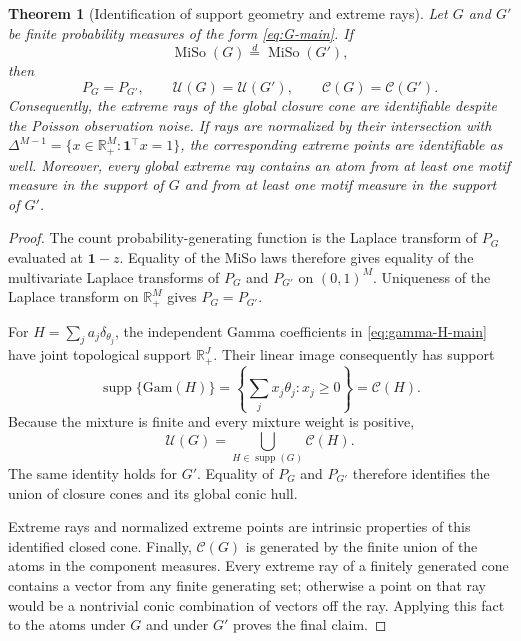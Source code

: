 \documentclass[11pt]{article}
\newcommand{\R}{\mathbb{R}}
\newcommand{\Gam}{\mathrm{Gam}}
\newcommand{\MiSo}{\operatorname{MiSo}}
\newcommand{\one}{\mathbf{1}}
\theoremstyle{plain}
\newtheorem{theorem}{Theorem}
\theoremstyle{definition}
\begin{document}
\begin{theorem}[Identification of support geometry and extreme rays]
\label{thm:global-cone-main}
Let $G$ and $G'$ be finite probability measures of the form
\eqref{eq:G-main}.  If
\[
  \MiSo(G)\overset{d}{=}\MiSo(G'),
\]
then
\[
  P_G=P_{G'},
  \qquad
  \mathcal U(G)=\mathcal U(G'),
  \qquad
  \mathcal C(G)=\mathcal C(G').
\]
Consequently, the extreme rays of the global closure cone are identifiable
despite the Poisson observation noise.  If rays are normalized by their
intersection with
$\Delta^{M-1}=\{x\in\R_+^M:\one^\top x=1\}$, the corresponding extreme
points are identifiable as well.  Moreover, every global extreme ray
contains an atom from at least one motif measure in the support of $G$ and
from at least one motif measure in the support of $G'$.
\end{theorem}

\begin{proof}
The count probability-generating function is the Laplace transform of $P_G$
evaluated at $\one-z$.  Equality of the MiSo laws therefore gives equality of
the multivariate Laplace transforms of $P_G$ and $P_{G'}$ on $(0,1)^M$.
Uniqueness of the Laplace transform on $\R_+^M$ gives $P_G=P_{G'}$.

For $H=\sum_j a_j\delta_{\theta_j}$, the independent Gamma coefficients in
\eqref{eq:gamma-H-main} have joint topological support $\R_+^J$.  Their
linear image consequently has support
\[
  \operatorname{supp}\{\Gam(H)\}
  =\left\{\sum_jx_j\theta_j:x_j\geq0\right\}
  =\mathcal C(H).
\]
Because the mixture is finite and every mixture weight is positive,
\begin{equation}
  \mathcal U(G)
  =\bigcup_{H\in\operatorname{supp}(G)}\mathcal C(H).
  \label{eq:union-cones-main}
\end{equation}
The same identity holds for $G'$.  Equality of $P_G$ and $P_{G'}$ therefore
identifies the union of closure cones and its global conic hull.

Extreme rays and normalized extreme points are intrinsic properties of this
identified closed cone.  Finally, $\mathcal C(G)$ is generated by the finite
union of the atoms in the component measures.  Every extreme ray of a
finitely generated cone contains a vector from any finite generating set;
otherwise a point on that ray would be a nontrivial conic combination of
vectors off the ray.  Applying this fact to the atoms under $G$ and under
$G'$ proves the final claim.
\end{proof}
\end{document}
